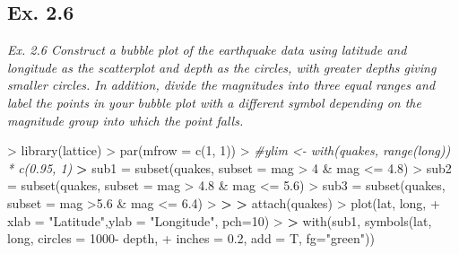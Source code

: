 \documentclass[
]{article}
\newenvironment{Shaded}{\begin{snugshade}}{\end{snugshade}}
\newcommand{\AttributeTok}[1]{\textcolor[rgb]{0.77,0.63,0.00}{#1}}
\newcommand{\CommentTok}[1]{\textcolor[rgb]{0.56,0.35,0.01}{\textit{#1}}}
\newcommand{\DecValTok}[1]{\textcolor[rgb]{0.00,0.00,0.81}{#1}}
\newcommand{\ErrorTok}[1]{\textcolor[rgb]{0.64,0.00,0.00}{\textbf{#1}}}
\newcommand{\FloatTok}[1]{\textcolor[rgb]{0.00,0.00,0.81}{#1}}
\newcommand{\FunctionTok}[1]{\textcolor[rgb]{0.00,0.00,0.00}{#1}}
\newcommand{\NormalTok}[1]{#1}
\newcommand{\OtherTok}[1]{\textcolor[rgb]{0.56,0.35,0.01}{#1}}
\newcommand{\SpecialCharTok}[1]{\textcolor[rgb]{0.00,0.00,0.00}{#1}}
\newcommand{\StringTok}[1]{\textcolor[rgb]{0.31,0.60,0.02}{#1}}
\begin{document}
\hypertarget{ex.-2.6}{%
\subsection{Ex. 2.6}\label{ex.-2.6}}

\emph{Ex. 2.6 Construct a bubble plot of the earthquake data using
latitude and longitude as the scatterplot and depth as the circles, with
greater depths giving smaller circles. In addition, divide the
magnitudes into three equal ranges and label the points in your bubble
plot with a different symbol depending on the magnitude group into which
the point falls.}

\begin{Shaded}
\begin{Highlighting}[]
\SpecialCharTok{\textgreater{}} \FunctionTok{library}\NormalTok{(lattice)}
\SpecialCharTok{\textgreater{}} \FunctionTok{par}\NormalTok{(}\AttributeTok{mfrow =} \FunctionTok{c}\NormalTok{(}\DecValTok{1}\NormalTok{, }\DecValTok{1}\NormalTok{))}
\SpecialCharTok{\textgreater{}} \CommentTok{\#ylim \textless{}{-} with(quakes, range(long)) * c(0.95, 1)}
\ErrorTok{\textgreater{}}\NormalTok{ sub1 }\OtherTok{=} \FunctionTok{subset}\NormalTok{(quakes, }\AttributeTok{subset =}\NormalTok{ mag }\SpecialCharTok{\textgreater{}} \DecValTok{4} \SpecialCharTok{\&}\NormalTok{ mag }\SpecialCharTok{\textless{}=} \FloatTok{4.8}\NormalTok{)}
\SpecialCharTok{\textgreater{}}\NormalTok{ sub2 }\OtherTok{=} \FunctionTok{subset}\NormalTok{(quakes, }\AttributeTok{subset =}\NormalTok{ mag }\SpecialCharTok{\textgreater{}} \FloatTok{4.8} \SpecialCharTok{\&}\NormalTok{ mag }\SpecialCharTok{\textless{}=} \FloatTok{5.6}\NormalTok{)}
\SpecialCharTok{\textgreater{}}\NormalTok{ sub3 }\OtherTok{=} \FunctionTok{subset}\NormalTok{(quakes, }\AttributeTok{subset =}\NormalTok{ mag }\SpecialCharTok{\textgreater{}}\FloatTok{5.6} \SpecialCharTok{\&}\NormalTok{ mag }\SpecialCharTok{\textless{}=} \FloatTok{6.4}\NormalTok{)}
\SpecialCharTok{\textgreater{}} 
\ErrorTok{\textgreater{}} 
\ErrorTok{\textgreater{}} \FunctionTok{attach}\NormalTok{(quakes)}
\SpecialCharTok{\textgreater{}} \FunctionTok{plot}\NormalTok{(lat, long,}
\SpecialCharTok{+}      \AttributeTok{xlab =} \StringTok{"Latitude"}\NormalTok{,}\AttributeTok{ylab =} \StringTok{"Longitude"}\NormalTok{, }\AttributeTok{pch=}\DecValTok{10}\NormalTok{)}
\SpecialCharTok{\textgreater{}} 
\ErrorTok{\textgreater{}} \FunctionTok{with}\NormalTok{(sub1, }\FunctionTok{symbols}\NormalTok{(lat, long, }\AttributeTok{circles =} \DecValTok{1000}\SpecialCharTok{{-}}\NormalTok{ depth,}
\SpecialCharTok{+}                    \AttributeTok{inches =} \FloatTok{0.2}\NormalTok{, }\AttributeTok{add =}\NormalTok{ T, }\AttributeTok{fg=}\StringTok{"green"}\NormalTok{))}

\end{Highlighting}
\end{Shaded}
\end{document}
